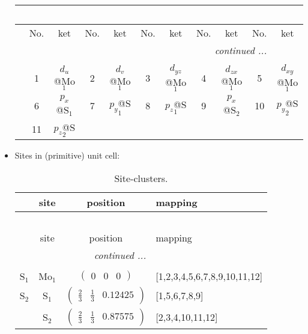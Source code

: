 \documentclass[fleqn,10pt,landscape]{article}
\begin{document}
\begin{itemize}
\begin{center}
\begin{longtable}{c|cc|cc|cc|cc|cc}
\multicolumn{10}{l}{\tablename\ \thetable{}} \\
 \hline \hline
 & No. & ket & No. & ket & No. & ket & No. & ket & No. & ket \\ \hline \endhead

 \hline \hline
\multicolumn{10}{r}{\footnotesize\it continued ...} \\ \endfoot

 \hline \hline
\multicolumn{10}{r}{} \\ \endlastfoot

 & 1 & $d_{u}$@Mo$_{1}$ & 2 & $d_{v}$@Mo$_{1}$ & 3 & $d_{yz}$@Mo$_{1}$ & 4 & $d_{zx}$@Mo$_{1}$ & 5 & $d_{xy}$@Mo$_{1}$ \\
& 6 & $p_{x}$@S$_{1}$ & 7 & $p_{y}$@S$_{1}$ & 8 & $p_{z}$@S$_{1}$ & 9 & $p_{x}$@S$_{2}$ & 10 & $p_{y}$@S$_{2}$ \\
& 11 & $p_{z}$@S$_{2}$ &  &  &  &  &  &  &  &  \\
\end{longtable}
\end{center}

\item Sites in (primitive) unit cell:
\begin{center}
\renewcommand{\arraystretch}{1.3}
\begin{longtable}{cc|c|l}
\caption{Site-clusters.}
 \\
 \hline \hline
 & site & position & mapping \\ \hline \endfirsthead

\multicolumn{3}{l}{\tablename\ \thetable{}} \\
 \hline \hline
 & site & position & mapping \\ \hline \endhead

 \hline \hline
\multicolumn{3}{r}{\footnotesize\it continued ...} \\ \endfoot

 \hline \hline
\multicolumn{3}{r}{} \\ \endlastfoot

S$_{1}$ & Mo$_1$ & $\begin{pmatrix} 0 & 0 & 0 \end{pmatrix}$ & [1,2,3,4,5,6,7,8,9,10,11,12] \\ \hline
S$_{2}$ & S$_1$ & $\begin{pmatrix} \frac{2}{3} & \frac{1}{3} & 0.12425 \end{pmatrix}$ & [1,5,6,7,8,9] \\
& S$_2$ & $\begin{pmatrix} \frac{2}{3} & \frac{1}{3} & 0.87575 \end{pmatrix}$ & [2,3,4,10,11,12] \\
\end{longtable}
\end{center}


\end{itemize}
\end{document}
